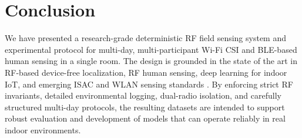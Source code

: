 \documentclass[11pt,a4paper]{article}
\begin{document}
\section{Conclusion}

We have presented a research-grade deterministic RF field sensing system and experimental protocol for multi-day, multi-participant Wi-Fi CSI and BLE-based human sensing in a single room. The design is grounded in the state of the art in RF-based device-free localization, RF human sensing, deep learning for indoor IoT, and emerging ISAC and WLAN sensing standards \cite{denis2019dfl,shahbazian2023human,abdelbasset2021indoor,wang2022isac,du2023bf}. By enforcing strict RF invariants, detailed environmental logging, dual-radio isolation, and carefully structured multi-day protocols, the resulting datasets are intended to support robust evaluation and development of models that can operate reliably in real indoor environments.
\end{document}
